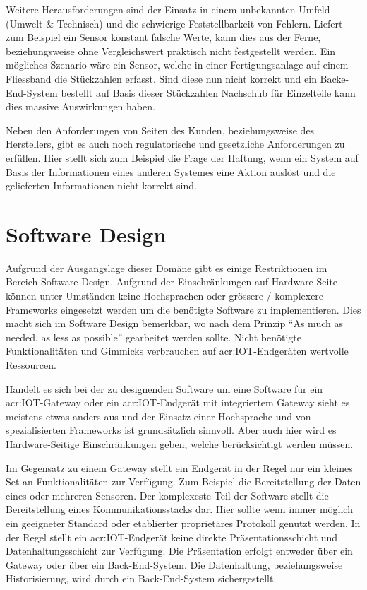 Weitere Herausforderungen sind der Einsatz in einem unbekannten Umfeld (Umwelt \& Technisch) und die schwierige Feststellbarkeit von Fehlern. Liefert zum Beispiel ein Sensor konstant falsche Werte, kann dies aus der Ferne, beziehungsweise ohne Vergleichswert praktisch nicht festgestellt werden. Ein mögliches Szenario wäre ein Sensor, welche in einer Fertigungsanlage auf einem Fliessband die Stückzahlen erfasst. Sind diese nun nicht korrekt und ein Backe-End-System bestellt auf Basis dieser Stückzahlen Nachschub für Einzelteile kann dies massive Auswirkungen haben.

Neben den Anforderungen von Seiten des Kunden, beziehungsweise des Herstellers, gibt es auch noch regulatorische und gesetzliche Anforderungen zu erfüllen. Hier stellt sich zum Beispiel die Frage der Haftung, wenn ein System auf Basis der Informationen eines anderen Systemes eine Aktion auslöst und die gelieferten Informationen nicht korrekt sind.



\section{Software Design}
Aufgrund der Ausgangslage dieser Domäne gibt es einige Restriktionen im Bereich Software Design. Aufgrund der Einschränkungen auf Hardware-Seite können unter Umständen keine Hochsprachen oder grössere / komplexere Frameworks eingesetzt werden um die benötigte Software zu implementieren. Dies macht sich im Software Design bemerkbar, wo nach dem Prinzip "`As much as needed, as less as possible"' gearbeitet werden sollte. Nicht benötigte Funktionalitäten und Gimmicks verbrauchen auf \gls{acr:IOT}-Endgeräten wertvolle Ressourcen.

Handelt es sich bei der zu designenden Software um eine Software für ein \gls{acr:IOT}-Gateway oder ein \gls{acr:IOT}-Endgerät mit integriertem Gateway sieht es meistens etwas anders aus und der Einsatz einer Hochsprache und von spezialisierten Frameworks ist grundsätzlich sinnvoll. Aber auch hier wird es Hardware-Seitige Einschränkungen geben, welche berücksichtigt werden müssen.

Im Gegensatz zu einem Gateway stellt ein Endgerät in der Regel nur ein kleines Set an Funktionalitäten zur Verfügung. Zum Beispiel die Bereitstellung der Daten eines oder mehreren Sensoren. Der komplexeste Teil der Software stellt die Bereitstellung eines Kommunikationsstacks dar. Hier sollte wenn immer möglich ein geeigneter Standard oder etablierter proprietäres Protokoll genutzt werden. In der Regel stellt ein \gls{acr:IOT}-Endgerät keine direkte Präsentationsschicht und Datenhaltungsschicht zur Verfügung. Die Präsentation erfolgt entweder über ein Gateway oder über ein Back-End-System. Die Datenhaltung, beziehungsweise Historisierung, wird durch ein Back-End-System sichergestellt. 

